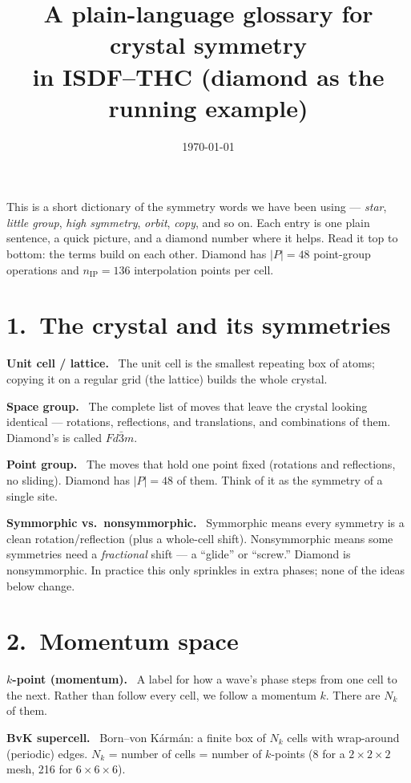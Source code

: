 \documentclass[11pt]{article}
\title{\vspace{-1.2cm}A plain-language glossary for crystal symmetry\\[2pt]
in ISDF--THC (diamond as the running example)}
\author{}
\date{\today}
\newcommand{\term}[1]{\medskip\noindent\textbf{#1.}\ }
\begin{document}
\maketitle
\vspace{-0.8cm}

This is a short dictionary of the symmetry words we have been using --- \emph{star}, \emph{little
group}, \emph{high symmetry}, \emph{orbit}, \emph{copy}, and so on. Each entry is one plain sentence,
a quick picture, and a diamond number where it helps. Read it top to bottom: the terms build on each
other. Diamond has $|P|=48$ point-group operations and $n_{\mathrm{IP}}=136$ interpolation points per
cell.

\section*{1.\ The crystal and its symmetries}

\term{Unit cell / lattice} The unit cell is the smallest repeating box of atoms; copying it on a
regular grid (the lattice) builds the whole crystal.

\term{Space group} The complete list of moves that leave the crystal looking identical --- rotations,
reflections, and translations, and combinations of them. Diamond's is called $Fd\bar{3}m$.

\term{Point group} The moves that hold one point fixed (rotations and reflections, no sliding). Diamond
has $|P|=48$ of them. Think of it as the symmetry of a single site.

\term{Symmorphic vs.\ nonsymmorphic} Symmorphic means every symmetry is a clean rotation/reflection
(plus a whole-cell shift). Nonsymmorphic means some symmetries need a \emph{fractional} shift --- a
``glide'' or ``screw.'' Diamond is nonsymmorphic. In practice this only sprinkles in extra phases;
none of the ideas below change.

\section*{2.\ Momentum space}

\term{$k$-point (momentum)} A label for how a wave's phase steps from one cell to the next. Rather than
follow every cell, we follow a momentum $k$. There are $N_k$ of them.

\term{BvK supercell} Born--von K\'arm\'an: a finite box of $N_k$ cells with wrap-around (periodic)
edges. $N_k$ = number of cells = number of $k$-points (8 for a $2\times2\times2$ mesh, 216 for
$6\times6\times6$).
\end{document}
